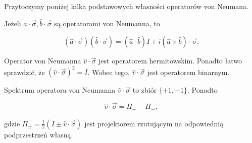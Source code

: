 Przytoczymy poniżej kilka podstawowych własności operatorów von Neumana.

\begin{theorem}
    Jeżeli $\hat{a} \cdot \vec{\sigma}, \hat{b} \cdot \vec{\sigma}$ są operatorami von Neumanna, to

    $$
        (\hat{a} \cdot \vec{\sigma}) (\hat{b} \cdot \vec{\sigma}) = \left(\hat{a} \cdot \hat{b} \right) I + i \left(\hat{a} \times \hat{b}\right) \cdot \vec{\sigma}.
    $$
\end{theorem}

\begin{fact}
    Operator von Neumanna $\hat{v} \cdot \vec{\sigma}$ jest operatorem hermitowskim. Ponadto łatwo sprawdzić, że $\left(\hat{v} \cdot \vec{\sigma}\right) ^ 2 = I$. Wobec tego, $\hat{v} \cdot \vec{\sigma}$ jest operatorem binarnym.
\end{fact}

\begin{fact}
    Spektrum operatora von Neumanna $\hat{v} \cdot \vec{\sigma}$ to zbiór $\{+1, -1\}$. Ponadto

    $$
    \hat{v} \cdot \vec{\sigma} = \Pi_{+} - \Pi_{-},
    $$

    gdzie $\Pi_{\pm} = \frac{1}{2} (I \pm \hat{v} \cdot \vec{\sigma})$ jest projektorem rzutującym na odpowiednią podprzestrzeń własną.
\end{fact}
